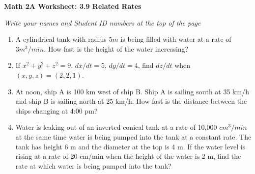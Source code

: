 \documentclass[12pt,fleqn]{article}
\begin{document}
\begin{center}
	\textbf{Math 2A Worksheet: 3.9 Related Rates}
\end{center}

\emph{Write your names and Student ID numbers at the top of the page}


\begin{enumerate}
\item A cylindrical tank with radius $5 m$ is being filled with water at a rate of $3 m^3/min.$  How fast is the height of the water increasing?\vfill


\item If $x^2+y^2+z^2=9$, $dx/dt=5$, $dy/dt=4$, find $dz/dt$ when $(x,y,z)=(2,2,1)$.\vfill


\newpage


\item At noon, ship A is 100 km west of ship B.  Ship A is sailing south at 35 km/h and ship B is sailing north at 25 km/h.  How fast is the distance between the ships changing at 4:00 pm?\vfill

\item Water is leaking out of an inverted conical tank at a rate of 10,000 $cm^3/min$ at the same time water is being pumped into the tank at a constant rate.  The tank has height 6 m and the diameter at the top is 4 m.  If the water level is rising at a rate of 20 cm/min when the height of the water is 2 m, find the rate at which water is being pumped into the tank?\vfill
\end{enumerate}
\end{document}
